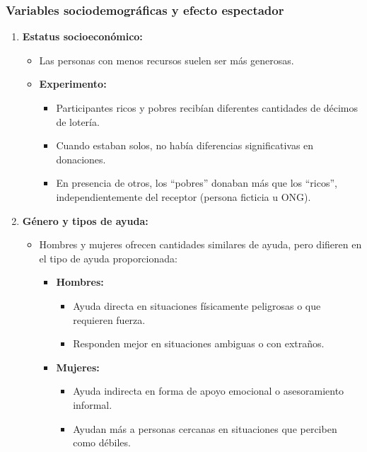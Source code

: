 \documentclass[
]{book}
\providecommand{\tightlist}{%
  \setlength{\itemsep}{0pt}\setlength{\parskip}{0pt}}
\begin{document}
\subsubsection{Variables sociodemográficas y efecto espectador}\label{variables-sociodemogruxe1ficas-y-efecto-espectador}

\begin{enumerate}
\def\labelenumi{\arabic{enumi}.}
\tightlist
\item
  \textbf{Estatus socioeconómico:}

  \begin{itemize}
  \tightlist
  \item
    Las personas con menos recursos suelen ser más generosas.\\
  \item
    \textbf{Experimento:}

    \begin{itemize}
    \tightlist
    \item
      Participantes ricos y pobres recibían diferentes cantidades de décimos de lotería.
    \item
      Cuando estaban solos, no había diferencias significativas en donaciones.
    \item
      En presencia de otros, los ``pobres'' donaban más que los ``ricos'', independientemente del receptor (persona ficticia u ONG).
    \end{itemize}
  \end{itemize}
\item
  \textbf{Género y tipos de ayuda:}

  \begin{itemize}
  \tightlist
  \item
    Hombres y mujeres ofrecen cantidades similares de ayuda, pero difieren en el tipo de ayuda proporcionada:

    \begin{itemize}
    \tightlist
    \item
      \textbf{Hombres:}

      \begin{itemize}
      \tightlist
      \item
        Ayuda directa en situaciones físicamente peligrosas o que requieren fuerza.
      \item
        Responden mejor en situaciones ambiguas o con extraños.
      \end{itemize}
    \item
      \textbf{Mujeres:}

      \begin{itemize}
      \tightlist
      \item
        Ayuda indirecta en forma de apoyo emocional o asesoramiento informal.
      \item
        Ayudan más a personas cercanas en situaciones que perciben como débiles.
      \end{itemize}
    \end{itemize}
  \end{itemize}
\end{enumerate}
\end{document}
